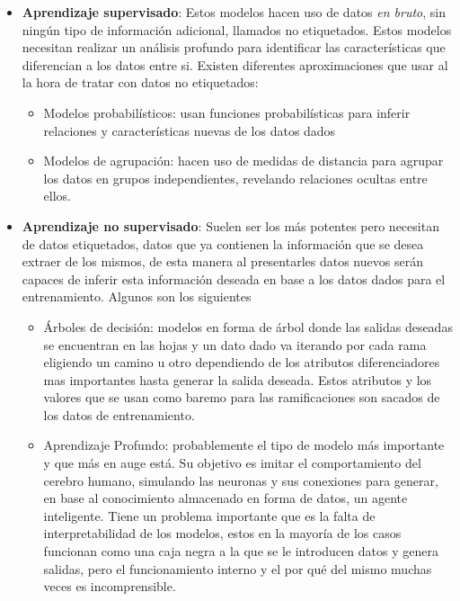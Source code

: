 \begin{itemize}
	\item \textbf{Aprendizaje supervisado}: Estos modelos hacen uso de datos
\textit{en bruto}, sin  ningún tipo de información adicional, llamados no
etiquetados. Estos modelos necesitan realizar un análisis profundo para
identificar las características que diferencian a los datos entre si. Existen
diferentes aproximaciones que usar al la hora de tratar con datos no
etiquetados: 
	\begin{itemize}
		\item Modelos probabilísticos: usan funciones probabilísticas para
		inferir relaciones y características nuevas de los datos dados
		\item Modelos de agrupación: hacen uso de medidas de distancia para
		agrupar los datos en grupos independientes, revelando relaciones ocultas
		entre ellos.
	\end{itemize}
	\item \textbf{Aprendizaje no supervisado}: Suelen ser los más potentes pero
necesitan de datos etiquetados, datos que ya contienen la información que se
desea extraer de los mismos, de esta manera al presentarles datos nuevos serán
capaces de inferir esta información deseada en base a los datos dados para el
entrenamiento. Algunos son los siguientes
	\begin{itemize}
	\item Árboles de decisión: modelos en forma de árbol donde las salidas
	deseadas se encuentran en las hojas y un dato dado va iterando por cada rama
	eligiendo un camino u otro dependiendo de los atributos diferenciadores mas
	importantes hasta generar la salida deseada. Estos atributos y los valores
	que se usan como baremo para las ramificaciones son sacados de los datos de
	entrenamiento.
	\item Aprendizaje Profundo: probablemente el tipo de modelo más importante y que
	más en auge está. Su objetivo es imitar el comportamiento del cerebro
	humano, simulando las neuronas y sus conexiones para generar, en base al
	conocimiento almacenado en forma de datos, un agente inteligente. Tiene un
	problema importante que es la falta de interpretabilidad de los modelos,
	estos en la mayoría de los casos funcionan como una caja negra a la que se
	le introducen datos y genera salidas, pero el funcionamiento interno y el
	por qué del mismo muchas veces es incomprensible.
	\end{itemize}
\end{itemize}



